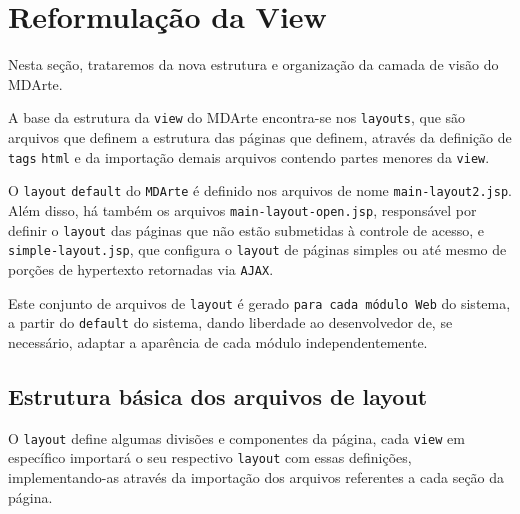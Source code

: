 \section{Reformulação da View}
Nesta seção, trataremos da nova estrutura e organização da camada de visão do
MDArte.

A base da estrutura da \texttt{view} do MDArte encontra-se nos \texttt{layouts},
que são arquivos que definem a estrutura das páginas que definem, através da
definição de \texttt{tags} \texttt{html} e da importação demais arquivos
contendo partes menores da \texttt{view}.

O \texttt{layout} \texttt{default} do \texttt{MDArte} é definido nos arquivos de
nome \texttt{main-layout2.jsp}. Além disso, há também os arquivos
\texttt{main-layout-open.jsp}, responsável por definir o \texttt{layout} das
páginas que não estão submetidas à controle de acesso, e
\texttt{simple-layout.jsp}, que configura o \texttt{layout} de páginas simples
ou até mesmo de porções de hypertexto retornadas via \texttt{AJAX}.

Este conjunto de arquivos de \texttt{layout} é gerado \texttt{para cada módulo
Web} do sistema, a partir do \texttt{default} do sistema, dando liberdade ao
desenvolvedor de, se necessário, adaptar a aparência de cada módulo
independentemente.

\subsection{Estrutura básica dos arquivos de layout}
O \texttt{layout} define algumas divisões e componentes da página, cada
\texttt{view} em específico importará o seu respectivo \texttt{layout} com essas
definições, implementando-as através da importação dos arquivos referentes a
cada seção da página.

